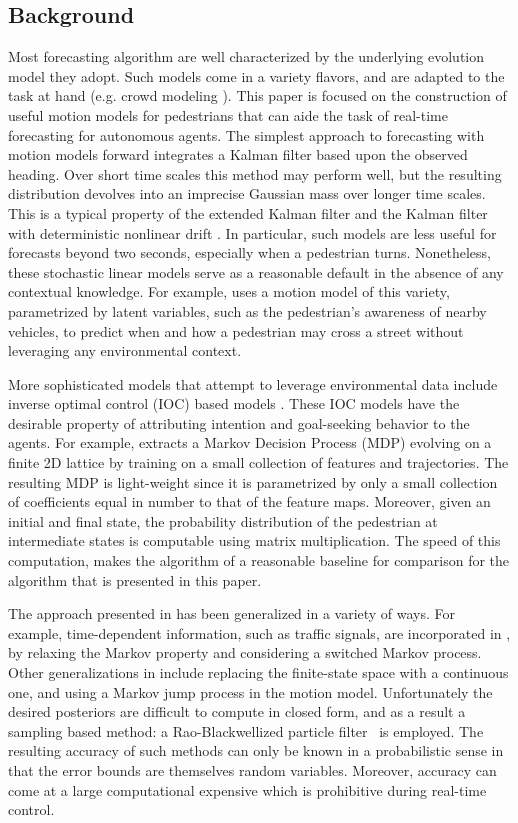 \documentclass[letterpaper,10pt,conference]{ieeeconf}
\begin{document}
\subsection{Background}
Most forecasting algorithm are well characterized by the underlying evolution model they adopt.
Such models come in a variety flavors, and are adapted to the task at hand (e.g. crowd modeling \cite{Helbing1992}).
This paper is focused on the construction of useful motion models for pedestrians that can aide the task of real-time forecasting for autonomous agents.
The simplest approach to forecasting with motion models forward integrates a Kalman filter \cite{kalman1960new} based upon the observed heading.
Over short time scales this method may perform well, but the resulting distribution devolves into an imprecise Gaussian mass over longer time scales.
This is a typical property of the extended Kalman filter and the Kalman filter with deterministic nonlinear drift \cite{Schneider2013}.
In particular, such models are less useful for forecasts beyond two seconds, especially when a pedestrian turns.
Nonetheless, these stochastic linear models serve as a reasonable default in the absence of any contextual knowledge.
For example, \cite{Kooji2014} uses a motion model of this variety, parametrized by latent variables, such as the pedestrian's awareness of nearby vehicles, to predict when and how a pedestrian may cross a street without leveraging any environmental context.

More sophisticated models that attempt to leverage environmental data include inverse optimal control (IOC) based models \cite{Ziebart2008,Ziebart2009,Kitani2012,Xie2013,Karasev2016}.
These IOC models have the desirable property of attributing intention and goal-seeking behavior to the agents.
For example, \cite{Kitani2012} extracts a Markov Decision Process (MDP) evolving on a finite 2D lattice by training on a small collection of features and trajectories.
The resulting MDP is light-weight since it is parametrized by only a small collection of coefficients equal in number to that of the feature maps.
Moreover, given an initial and final state, the probability distribution of the pedestrian at intermediate states is computable using matrix multiplication.
The speed of this computation, makes the algorithm of \cite{Kitani2012} a reasonable baseline for comparison for the algorithm that is presented in this paper.

The approach presented in \cite{Kitani2012} has been generalized in a variety of ways.
For example, time-dependent information, such as traffic signals, are incorporated in \cite{Karasev2016}, by relaxing the Markov property and considering a switched Markov process.
Other generalizations in \cite{Karasev2016} include replacing the finite-state space with a continuous one, and using a Markov jump process in the motion model.
Unfortunately the desired posteriors are difficult to compute in closed form, and as a result a sampling based method: a Rao-Blackwellized particle filter~\cite{Doucet2000} is employed.
The resulting accuracy of such methods can only be known in a probabilistic sense in that the error bounds are themselves random variables.
Moreover, accuracy can come at a large computational expensive which is prohibitive during real-time control.
\end{document}

